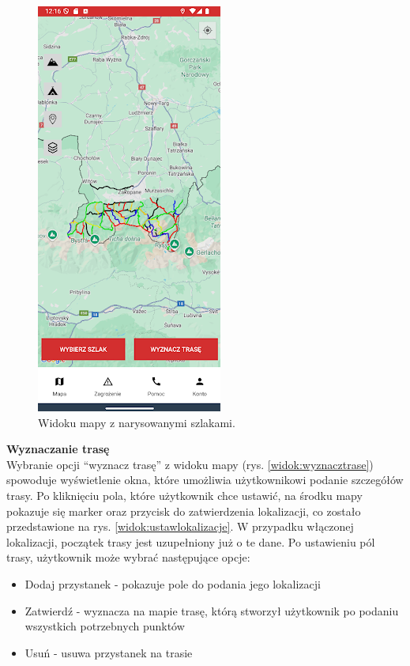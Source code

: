 \begin{figure}[H]
    \centering
    \includegraphics[scale=0.70]{img/imp/widok-mapa.png}
    \caption{Widoku mapy z narysowanymi szlakami.}
    \label{widok:map}
\end{figure}

\textbf{Wyznaczanie trasę} \\
Wybranie opcji “wyznacz trasę” z widoku mapy (rys. \ref{widok:wyznacztrase}) spowoduje wyświetlenie okna, które umożliwia użytkownikowi podanie szczegółów trasy. Po kliknięciu pola, które użytkownik chce ustawić, na środku mapy pokazuje się marker oraz przycisk do zatwierdzenia lokalizacji, co zostało przedstawione na rys. \ref{widok:ustawlokalizacje}. W przypadku włączonej lokalizacji, początek trasy jest uzupełniony już o te dane. Po ustawieniu pól trasy, użytkownik może wybrać następujące opcje:
\begin{itemize}
    \item Dodaj przystanek - pokazuje pole do podania jego lokalizacji
    \item Zatwierdź - wyznacza na mapie trasę, którą stworzył użytkownik po podaniu wszystkich potrzebnych punktów
    \item Usuń - usuwa przystanek na trasie
\end{itemize}

